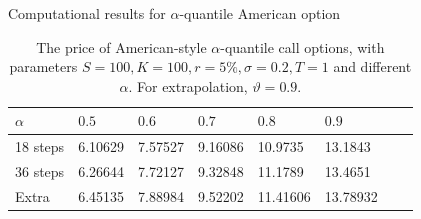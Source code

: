 \documentclass[cjk,10pt]{beamer}
\begin{document}
\begin{frame}{Computational results for $\alpha$-quantile American option}
\begin{table}[p]
\caption{The price of American-style $\alpha$-quantile call options, with parameters
	$S=100, K=100, r=5\%, \sigma=0.2, T=1$ and different $\alpha$. For extrapolation, $\vartheta=0.9$.  }
\begin{center}
\begin{tabular}{l|lllllll}
$\alpha$ & $0.5$ & $0.6$ & $0.7$ & $0.8$ & $0.9$       \\
\hline
18 steps & 6.10629 & 7.57527 & 9.16086 & 10.9735 & 13.1843\\
36 steps & 6.26644 & 7.72127 & 9.32848 & 11.1789 & 13.4651\\
\hline
Extra & 6.45135 & 7.88984 & 9.52202 & 11.41606 & 13.78932 
\end{tabular}
\end{center}
\label{fig:amerc}
\end{table}%

\end{frame}
\end{document}
